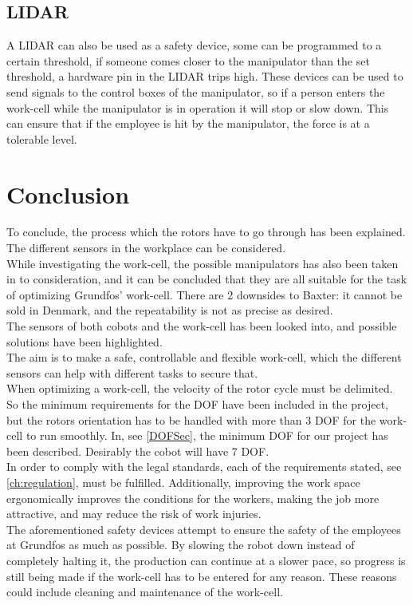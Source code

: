 \subsection{LIDAR}
A LIDAR can also be used as a safety device\cite{LIDAR}, some can be programmed to a certain threshold, if someone comes closer to the manipulator than the set threshold, a hardware pin in the LIDAR trips high. These devices can be used to send signals to the control boxes of the manipulator, so if a person enters the work-cell while the manipulator is in operation it will stop or slow down. This can ensure that if the employee is hit by the manipulator, the force is at a tolerable level.\\



\section{Conclusion}


To conclude, the process which the rotors have to go through has been explained. The different sensors in the workplace can be considered.\\
While investigating the work-cell, the possible manipulators has also been taken in to consideration, and it can be concluded that they are all suitable for the task of optimizing Grundfos' work-cell. There are 2 downsides to Baxter: it cannot be sold in Denmark, and the repeatability is not as precise as desired.\\
The sensors of both cobots and the work-cell has been looked into, and possible solutions have been highlighted.\\
The aim is to make a safe, controllable and flexible work-cell, which the different sensors can help with different tasks to secure that.\\
When optimizing a work-cell, the velocity of the rotor cycle must be delimited. So the minimum requirements for the DOF have been included in the project, but the rotors orientation has to be handled with more than 3 DOF for the work-cell to run smoothly. In, see \ref{DOFSec}, the minimum DOF for our project has been described. Desirably the cobot will have 7 DOF.\\
In order to comply with the legal standards, each of the requirements stated, see \ref{ch:regulation}, must be fulfilled. Additionally, improving the work space ergonomically improves the conditions for the workers, making the job more attractive, and may reduce the risk of work injuries.\\
The aforementioned safety devices attempt to ensure the safety of the employees at Grundfos as much as possible. By slowing the robot down instead of completely halting it, the production can continue at a slower pace, so progress is still being made if the work-cell has to be entered for any reason. These reasons could include cleaning and maintenance of the work-cell.\\



